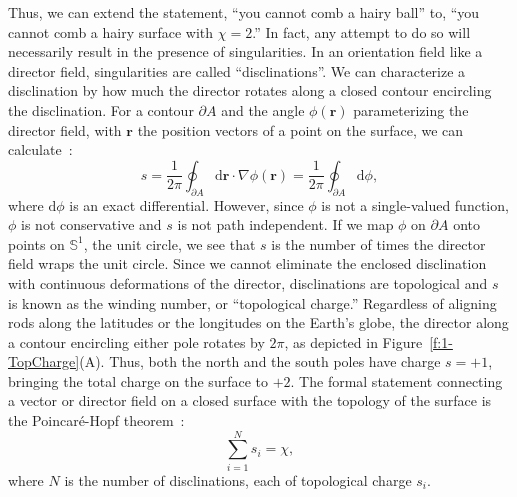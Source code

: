 Thus, we can extend the statement, ``you cannot comb a hairy ball'' to, ``you cannot comb a hairy surface with $\chi=2$.''
In fact, any attempt to do so will necessarily result in the presence of singularities.
In an orientation field like a director field, singularities are called ``disclinations''.
We can characterize a disclination by how much the director rotates along a closed contour encircling the disclination.
For a contour $\partial A$ and the angle $\phi(\mathbf{r})$ parameterizing the director field, with $\mathbf{r}$ the position vectors of a point on the surface, we can calculate~\cite{RN23,RN153,RN203}:
\begin{equation}
  s = \frac{1}{2 \pi}\oint_{\partial A} \textrm{d}\mathbf{r} \cdot \nabla\phi(\mathbf{r}) = \frac{1}{2\pi} \oint_{\partial A} \textrm{d} \phi,\label{eq:1-topCharge}
\end{equation}
where $\textrm{d}\phi$ is an exact differential.
However, since $\phi$ is not a single-valued function, $\phi$ is not conservative and $s$ is not path independent.
If we map $\phi$ on $\partial A$ onto points on $\mathbb{S}^1$, the unit circle, we see that $s$ is the number of times the director field wraps the unit circle.
Since we cannot eliminate the enclosed disclination with continuous deformations of the director, disclinations are topological and $s$ is known as the winding number, or ``topological charge.''
Regardless of aligning rods along the latitudes or the longitudes on the Earth's globe, the director along a contour encircling either pole rotates by $2 \pi$, as depicted in Figure~\ref{f:1-TopCharge}(A).
Thus, both the north and the south poles have charge $s = +1$, bringing the total charge on the surface to $+2$.
The formal statement connecting a vector or director field on a closed surface with the topology of the surface is the Poincar\'e-Hopf theorem~\cite{RN23}:
\begin{equation}
  \sum\limits_{i = 1}^{N} s_i = \chi,\label{e:1-PH}
\end{equation}
where $N$ is the number of disclinations, each of topological charge $s_i$.

